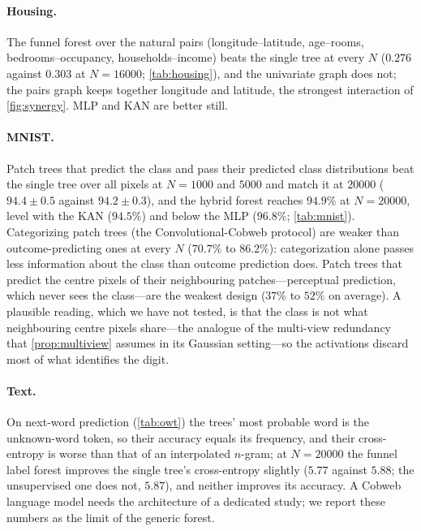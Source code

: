 \documentclass[11pt]{article}
\theoremstyle{definition}
\theoremstyle{remark}
\begin{document}
\paragraph{Housing.}
The funnel forest over the natural pairs (longitude--latitude, age--rooms,
bedrooms--occupancy, households--income) beats the single tree at every $N$
($0.276$ against $0.303$ at $N=16000$; \cref{tab:housing}), and the univariate graph
does not; the pairs graph keeps together longitude and latitude, the strongest
interaction of \cref{fig:synergy}.  MLP and KAN are better still.

\paragraph{MNIST.}
Patch trees that predict the class and pass their predicted class distributions beat the
single tree over all pixels at $N=1000$ and $5000$ and match it at $20000$ ($94.4\pm0.5$
against $94.2\pm0.3$), and the hybrid forest reaches $94.9\%$ at
$N=20000$, level with the KAN ($94.5\%$) and below the MLP ($96.8\%$; \cref{tab:mnist}).
Categorizing patch trees (the Convolutional-Cobweb protocol) are weaker than
outcome-predicting ones at every $N$ ($70.7\%$ to $86.2\%$): categorization alone passes
less information about the class than outcome prediction does.  Patch trees that predict
the centre pixels of their neighbouring patches---perceptual prediction, which never sees
the class---are the weakest design ($37\%$ to $52\%$ on average).  A plausible reading, which we have
not tested, is that the class is not what neighbouring centre pixels share---the analogue
of the multi-view redundancy that \cref{prop:multiview} assumes in its Gaussian
setting---so the activations discard most of what identifies the digit.

\paragraph{Text.}
On next-word prediction (\cref{tab:owt}) the trees' most probable word is the unknown-word
token, so their accuracy equals its frequency, and their cross-entropy is worse than that
of an interpolated $n$-gram; at $N=20000$ the funnel label forest improves the single tree's
cross-entropy slightly ($5.77$ against $5.88$; the unsupervised one does not, $5.87$), and
neither improves its accuracy.  A Cobweb language
model needs the architecture of a dedicated study; we report these numbers as the limit
of the generic forest.

\end{document}
